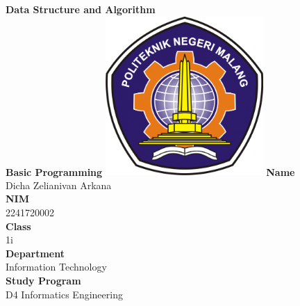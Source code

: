 \documentclass[12pt,titlepage]{article}
\newcommand{\vSubject}{Data Structure and Algorithm}
\newcommand{\vSubtitle}{Basic Programming}
\newcommand{\vName}{Dicha Zelianivan Arkana}
\newcommand{\vNIM}{2241720002}
\newcommand{\vClass}{1i}
\newcommand{\vDepartment}{Information Technology}
\newcommand{\vStudyProgram}{D4 Informatics Engineering}
\begin{document}
\begin{titlepage}
    \centering
    \vfill
    {\bfseries\LARGE
        \vSubject\\
        \vskip0.25cm
        \vSubtitle
    }
    \vfill
    \includegraphics[width=6cm]{images/polinema-logo.png}
    \vfill
    {
        \textbf{Name}\\
        \vName\\
        \vskip0.5cm
        \textbf{NIM}\\
        \vNIM\\
        \vskip0.5cm
        \textbf{Class}\\
        \vClass\\
        \vskip0.5cm
        \textbf{Department}\\
        \vDepartment\\
        \vskip0.5cm
        \textbf{Study Program}\\
        \vStudyProgram
    }
\end{titlepage}
\end{document}
